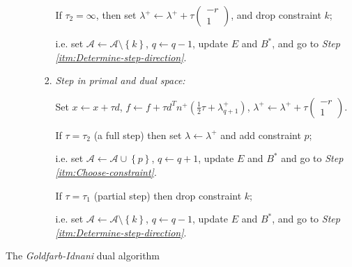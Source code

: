 \documentclass[a4paper,twoside,10pt,english]{report}
\begin{document}
\begin{algorithm}[!htb]
\begin{enumerate}[start=0]
\begin{enumerate}
\begin{enumerate}
        If $\tau_{2}=\infty$, then set 
        $\lambda^{+}\leftarrow\lambda^{+}+
        \tau\left(\begin{array}{c}
                    -r\\
                    1
                  \end{array}\right)$, and drop constraint $k$; 

        \hspace{5mm}i.e. set $\mathcal{A}\leftarrow\mathcal{A}\setminus
        \left\{k\right\}$, $q\leftarrow q-1$, update $E$ and $B^{*}$, and go to 
        \emph{Step \ref{itm:Determine-step-direction}}.

    \item \emph{Step in primal and dual space:} 

      Set $x\leftarrow x+\tau d$, 
      $f\leftarrow f+\tau d^{T}n^{+}\left(\frac{1}{2}\tau+\lambda_{q+1}^{+}\right)$,
      $\lambda^{+}\leftarrow\lambda^{+}+\tau\left(\begin{array}{c}
                                                    -r\\
                                                    1\end{array}\right)$.

      If $\tau=\tau_{2}$ (a full step) then set $\lambda\leftarrow\lambda^{+}$ 
      and add constraint $p$; 

      \hspace{5mm}i.e. set 
      $\mathcal{A}\leftarrow\mathcal{A}\cup\left\{ p\right\} $,
      $q\leftarrow q+1$, update $E$ and $B^{*}$ and go to \emph{Step
        \ref{itm:Choose-constraint}}.

      If $\tau=\tau_{1}$ (partial step) then drop constraint $k$; 

      \hspace{5mm}i.e. set
      $\mathcal{A}\leftarrow\mathcal{A}\setminus\left\{ k\right\} $, 
      $q\leftarrow q-1$, update $E$ and $B^{*}$, and go to \emph{Step 
        \ref{itm:Determine-step-direction}}.
    \end{enumerate}
  \end{enumerate}
\end{enumerate}
\caption{The \emph{Goldfarb-Idnani} dual algorithm
~\cite{GoldfarbIdnani_NumericallyStableDualQuadraticPrograms}}
\label{alg:The-dual-algorithm}
\end{algorithm}
\clearpage
\end{document}
